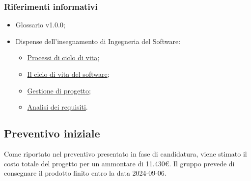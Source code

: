 \subsubsection{Riferimenti informativi}
\begin{itemize}
\setlength\itemsep{0em}
    \item Glossario v1.0.0;
    \item Dispense dell'insegnamento di Ingegneria del Software: 
    \begin{itemize}
    \setlength\itemsep{0em}
        \item \href{https://www.math.unipd.it/~tullio/IS-1/2023/Dispense/T2.pdf}{Processi di ciclo di vita};
        \item \href{https://www.math.unipd.it/~tullio/IS-1/2023/Dispense/T3.pdf}{Il ciclo di vita del software};
        \item \href{https://www.math.unipd.it/~tullio/IS-1/2023/Dispense/T4.pdf}{Gestione di progetto};
        \item \href{https://www.math.unipd.it/~tullio/IS-1/2023/Dispense/T5.pdf}{Analisi dei requisiti}.
    \end{itemize}
    \end{itemize}

\subsection{Preventivo iniziale}
Come riportato nel preventivo presentato in fase di candidatura, viene stimato il costo totale del progetto per un ammontare di 11.430€. Il gruppo prevede di consegnare il prodotto finito entro la data 2024-09-06.